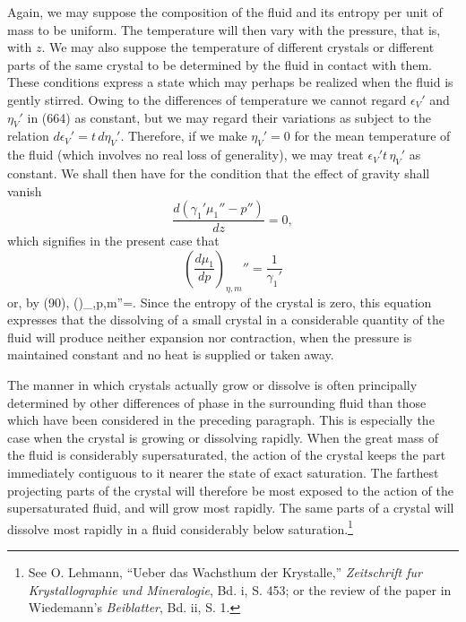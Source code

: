 \documentclass[12pt]{article}
\begin{document}
Again, we may suppose the composition of the fluid and its entropy per unit of mass to be uniform. The temperature will then vary with the pressure, that is, with $z$. We may also suppose the temperature of different crystals or different parts of the same crystal to be determined by the fluid in contact with them. These conditions express a state which may perhaps be realized when the fluid is gently stirred. Owing to the differences of temperature we cannot regard $\epsilon_V'$ and $\eta_V'$ in (664) as constant, but we may regard their variations as subject to the relation $d\epsilon_V'= t \,d\eta_V'$. Therefore, if we make $\eta_V' =0$ for the mean temperature of the fluid (which involves no real loss of generality), we may treat $\epsilon_V' t \,\eta_V'$ as constant. We shall then have for the condition that the effect of gravity shall vanish
$$ \frac{d(\gamma_1'\mu_1'' -p'' )}{dz}=0,$$
which signifies in the present case that
$$ \left(\frac{d\mu_1}{dp}\right)_{\eta,m}''=\frac{1}{\gamma_1'}$$
or, by (90),
\eqs \left(\right)_{\eta,p,m}''=.\label{670}\eqe
Since the entropy of the crystal is zero, this equation expresses that the dissolving of a small crystal in a considerable quantity of the fluid will produce neither expansion nor contraction, when the pressure is maintained constant and no heat is supplied or taken away.

The manner in which crystals actually grow or dissolve is often principally determined by other differences of phase in the surrounding fluid than those which have been considered in the preceding paragraph. This is especially the case when the crystal is growing or dissolving rapidly. When the great mass of the fluid is considerably supersaturated, the action of the crystal keeps the part immediately contiguous to it nearer the state of exact saturation. The farthest projecting parts of the crystal will therefore be most exposed to the action of the supersaturated fluid, and will grow most rapidly. The same parts of a crystal will dissolve most rapidly in a fluid considerably below saturation.\footnote{See O. Lehmann, ``Ueber das Wachsthum der Krystalle,'' \textit{Zeitschrift fur Krystallographie und Mineralogie}, Bd. i, S. 453; or the review of the paper in Wiedemann's \textit{Beiblatter}, Bd. ii, S. 1.}
\end{document}
